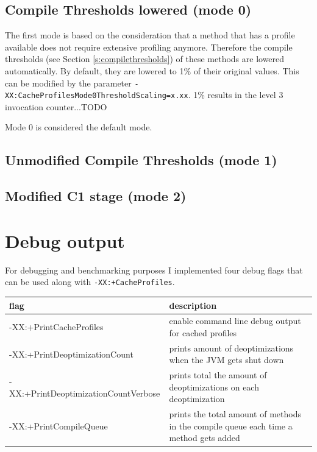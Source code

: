 \label{s:cacheprofilesmode}
\subsection{Compile Thresholds lowered (mode 0)}
\label{s:mode0}
The first mode is based on the consideration that a method that has a profile available does not require extensive profiling anymore. Therefore the compile thresholds (see Section \ref{s:compilethresholds}) of these methods are lowered automatically. By default, they are lowered to 1\% of their original values. This can be modified by the parameter \texttt{-XX:CacheProfilesMode0ThresholdScaling=x.xx}. 1\% results in the level 3 invocation counter...TODO

Mode 0 is considered the default mode.
\subsection{Unmodified Compile Thresholds (mode 1)}
\label{s:mode1}
\subsection{Modified C1 stage (mode 2)}
\label{s:mode2}

\section{Debug output}
\label{s:debugoutput}
For debugging and benchmarking purposes I implemented four debug flags that can be used along with \texttt{-XX:+CacheProfiles}.
\begin{table}[ht]
  \centering
  \label{t:debugflags}
  \begin{center}
    \begin{tabular}{| l | p{9.0cm} |}
       \hline
       \textbf{flag} & \textbf{description} \\ \hline\hline
       -XX:+PrintCacheProfiles & enable command line debug output for cached profiles\\ \hline
       -XX:+PrintDeoptimizationCount & prints amount of deoptimizations when the JVM gets shut down\\ \hline
       -XX:+PrintDeoptimizationCountVerbose & prints total the amount of deoptimizations on each deoptimization\\ \hline
       -XX:+PrintCompileQueue & prints the total amount of methods in the compile queue each time a method gets added \\ \hline
    \end{tabular}
  \end{center}
\end{table}


